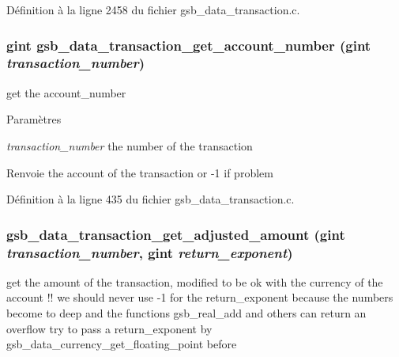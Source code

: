 Définition à la ligne 2458 du fichier gsb\_\-data\_\-transaction.c.

\subsubsection[{gsb\_\-data\_\-transaction\_\-get\_\-account\_\-number}]{\setlength{\rightskip}{0pt plus 5cm}gint gsb\_\-data\_\-transaction\_\-get\_\-account\_\-number (gint {\em transaction\_\-number})}\label{gsb__data__transaction_8c_a5b486efbc486f946e9c998a114054bce}
get the account\_\-number


\begin{DoxyParams}{Paramètres}
\item[{\em transaction\_\-number}]the number of the transaction\end{DoxyParams}
\begin{DoxyReturn}{Renvoie}
the account of the transaction or -\/1 if problem 
\end{DoxyReturn}


Définition à la ligne 435 du fichier gsb\_\-data\_\-transaction.c.

\subsubsection[{gsb\_\-data\_\-transaction\_\-get\_\-adjusted\_\-amount}]{ gsb\_\-data\_\-transaction\_\-get\_\-adjusted\_\-amount (gint {\em transaction\_\-number}, \/  gint {\em return\_\-exponent})}\label{gsb__data__transaction_8c_aa3739bd33106e8dbce2c0938f5f2a882}
get the amount of the transaction, modified to be ok with the currency of the account !! we should never use -\/1 for the return\_\-exponent because the numbers become to deep and the functions gsb\_\-real\_\-add and others can return an overflow try to pass a return\_\-exponent by gsb\_\-data\_\-currency\_\-get\_\-floating\_\-point before


